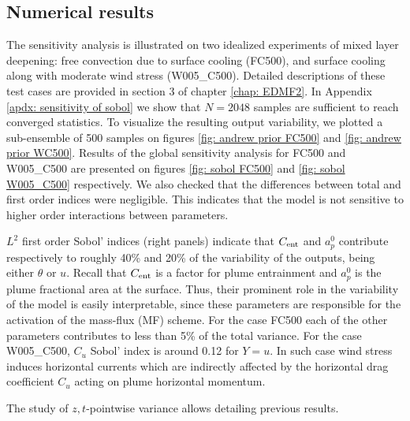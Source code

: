 \documentclass[draft]{agujournal2019}
\begin{document}
\subsection{Numerical results}
%
The sensitivity analysis is illustrated on two idealized experiments of mixed layer deepening: free convection due to surface cooling (FC500), and surface cooling along with moderate wind stress (W005\_C500). Detailed descriptions of these test cases are provided in section 3 of chapter \ref{chap: EDMF2}. In Appendix \ref{apdx: sensitivity of sobol} we show that $N=2048$ samples are sufficient to reach converged statistics. To visualize the resulting output variability, we plotted a sub-ensemble of 500 samples on figures \ref{fig: andrew prior FC500} and \ref{fig: andrew prior WC500}.
%
%
Results of the global sensitivity analysis for FC500 and W005\_C500 are presented on figures \ref{fig: sobol FC500} and \ref{fig: sobol W005_C500} respectively. We also checked that the differences between total and first order indices were negligible. This indicates that the model is not sensitive to higher order interactions between parameters. 
\par $L^2$ first order Sobol' indices (right panels) indicate that $C_{\rm ent}$ and $a_p^0$ contribute respectively to roughly 40\% and 20\% of the variability of the outputs, being either $\theta$ or $u$. Recall that $C_{\rm ent}$ is a factor for plume entrainment and $a_p^0$ is the plume fractional area at the surface. Thus, their prominent role in the variability of the model is easily interpretable, since these parameters are responsible for the activation of the mass-flux (MF) scheme. For the case FC500 each of the other parameters contributes to less than 5\% of the total variance. For the case W005\_C500, $C_u$ Sobol' index is around 0.12 for $Y=u$. In such case wind stress induces horizontal currents which are indirectly affected by the horizontal drag coefficient $C_u$ acting on plume horizontal momentum.
%
\par 
The study of $z,t$-pointwise variance allows detailing previous results. 
\end{document}
